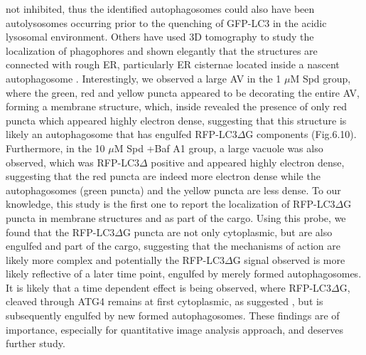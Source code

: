 not inhibited, thus the identified autophagosomes could also have been autolysosomes occurring prior to the quenching of GFP-LC3 in the acidic lysosomal environment. Others have used 3D tomography to study the localization of phagophores and shown elegantly that the structures are connected with rough ER, particularly ER cisternae located inside a nascent autophagosome \citep{Yla-Anttila2009}. Interestingly, we observed a large AV in the 1 $\mu$M Spd group, where the green, red and yellow puncta appeared to be decorating the entire AV, forming a membrane structure, which, inside revealed the presence of only red puncta which appeared highly electron dense, suggesting that this structure is likely an autophagosome that has engulfed RFP-LC3$\Delta$G components (Fig.6.10). Furthermore, in the 10 $\mu$M Spd +Baf A1 group, a large vacuole was also observed, which was RFP-LC3$\Delta$ positive and appeared highly electron dense, suggesting that the red puncta are indeed more electron dense while the autophagosomes (green puncta) and the yellow puncta are less dense. To our knowledge, this study is the first one to report the localization of RFP-LC3$\Delta$G puncta in membrane structures and as part of the cargo. Using this probe, we found that the RFP-LC3$\Delta$G puncta are not only cytoplasmic, but are also engulfed and part of the cargo, suggesting that the mechanisms of action are likely more complex and potentially the RFP-LC3$\Delta$G signal observed is more likely reflective of a later time point, engulfed by merely formed autophagosomes. It is likely that a time dependent effect is being observed, where RFP-LC3$\Delta$G, cleaved  through ATG4 remains at first cytoplasmic, as suggested \citep{Kaizuka2016}, but is subsequently engulfed by new formed autophagosomes. These findings are of importance, especially for quantitative image analysis approach, and deserves further study.

